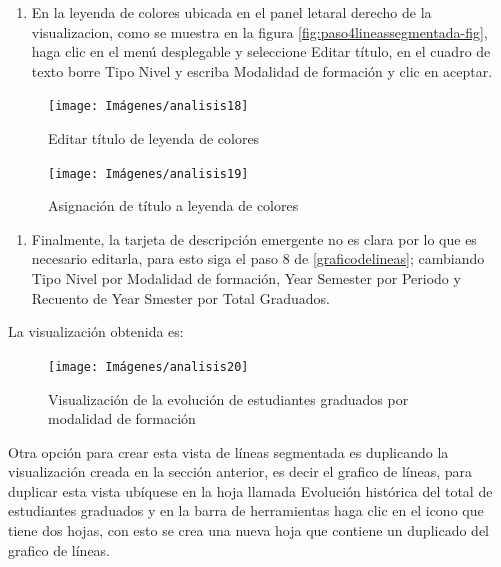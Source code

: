 \documentclass[
]{book}
\providecommand{\tightlist}{%
  \setlength{\itemsep}{0pt}\setlength{\parskip}{0pt}}
\begin{document}
\begin{enumerate}
\def\labelenumi{\arabic{enumi}.}
\setcounter{enumi}{5}
\tightlist
\item
  En la leyenda de colores ubicada en el panel letaral derecho de la visualizacion, como se muestra en la figura \ref{fig:paso4lineassegmentada-fig}, haga clic en el menú desplegable y seleccione Editar título, en el cuadro de texto borre Tipo Nivel y escriba Modalidad de formación y clic en aceptar.
\end{enumerate}

\begin{figure}

{\centering \texttt{[image: Imágenes/analisis18]} 

}

\caption{Editar título de leyenda de colores}\label{fig:paso6lineassegmentada-fig}
\end{figure}

\begin{figure}

{\centering \texttt{[image: Imágenes/analisis19]} 

}

\caption{Asignación de título a leyenda de colores}\label{fig:paso6-1lineassegmentada-fig}
\end{figure}

\begin{enumerate}
\def\labelenumi{\arabic{enumi}.}
\setcounter{enumi}{6}
\tightlist
\item
  Finalmente, la tarjeta de descripción emergente no es clara por lo que es necesario editarla, para esto siga el paso 8 de \ref{graficodelineas}; cambiando Tipo Nivel por Modalidad de formación, Year Semester por Periodo y Recuento de Year Smester por Total Graduados.
\end{enumerate}

La visualización obtenida es:

\begin{figure}

{\centering \texttt{[image: Imágenes/analisis20]} 

}

\caption{Visualización de la evolución de estudiantes graduados por modalidad de formación}\label{fig:lineassegmentada-fig}
\end{figure}

Otra opción para crear esta vista de líneas segmentada es duplicando la visualización creada en la sección anterior, es decir el grafico de líneas, para duplicar esta vista ubíquese en la hoja llamada Evolución histórica del total de estudiantes graduados y en la barra de herramientas haga clic en el icono que tiene dos hojas, con esto se crea una nueva hoja que contiene un duplicado del grafico de líneas.
\end{document}
